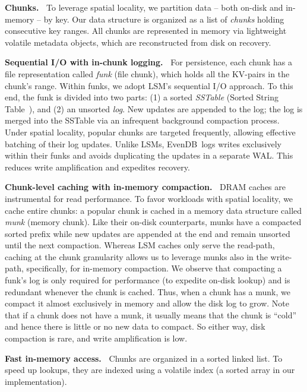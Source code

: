 \documentclass[sigplan,10pt]{acmart}
\newcommand{\sys}{EvenDB}
\begin{document}
{\bf Chunks.\ }
To leverage spatial locality, we partition data -- both on-disk and in-memory -- by key.
Our  data structure is organized as a 
list of \emph{chunks} holding consecutive key ranges. 
All chunks are represented in memory via lightweight volatile metadata objects, which are reconstructed from disk on recovery.

{\bf Sequential I/O with in-chunk logging.\ }
For persistence, each chunk has a file representation called  \emph{funk} (file chunk), which holds all the KV-pairs in the chunk's range.
Within funks, we adopt LSM's sequential I/O approach. To this end, the funk 
is divided into two parts: (1) a sorted \emph{SSTable} (Sorted String Table~\cite{Bigtable2008}), and (2) an unsorted \emph{log}. 
New updates are appended to the log; the log is  merged into the SSTable via an infrequent background compaction process. 
Under spatial locality,  popular chunks are targeted frequently, allowing effective batching of their log updates. 
Unlike LSMs, \sys\ logs writes exclusively within their funks and avoids duplicating the updates  in a separate WAL. This reduces write amplification and expedites recovery. 

{\bf Chunk-level caching with in-memory compaction.\ }
DRAM caches are instrumental for read performance. 
To favor workloads with spatial locality, we cache entire chunks:
a popular chunk is cached in a  memory data structure called \emph{munk} (memory chunk).
Like their on-disk counterparts, munks have a compacted sorted prefix while new updates are appended at the end and remain unsorted until the next compaction. 
Whereas LSM caches  only serve the read-path, caching at the chunk granularity allows us to 
leverage munks also in the write-path, specifically, for in-memory compaction.  
We observe that 
compacting a funk's log is only required for performance (to expedite on-disk lookup) and is redundant whenever the chunk is cached. Thus, when 
a chunk has a munk, we compact it almost exclusively in memory and allow the disk log to grow. 
Note that if a chunk does not have a munk, it usually means that the chunk is ``cold'' 
and hence there is little or no new data to compact. So either way,  disk compaction is rare, and write amplification is low.

{\bf Fast in-memory access.\ }
Chunks are organized in a sorted linked list. To speed up lookups, they are indexed using a volatile index (a sorted array in our implementation).  
\end{document}
